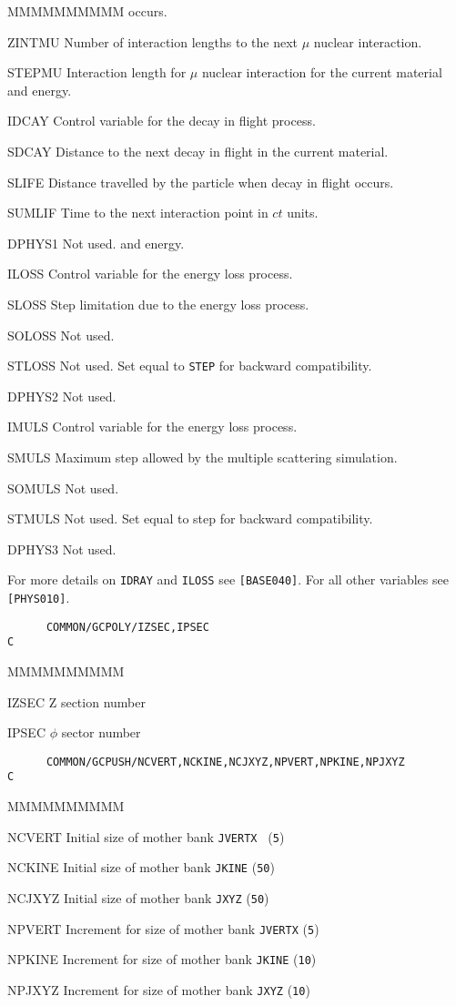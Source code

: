 \begin{DLtt}{MMMMMMMMMM}
occurs.
\item[ZINTMU] Number of interaction lengths to the next $\mu$ nuclear interaction.
\item[STEPMU] Interaction length for $\mu$ nuclear interaction for the current 
material and energy.
\item[IDCAY] Control variable for the decay in flight process.
\item[SDCAY] Distance to the next decay in flight in the current material.
\item[SLIFE] Distance travelled by the particle when decay in flight occurs.
\item[SUMLIF] Time to the next interaction point in $ct$ units.
\item[DPHYS1] Not used.
and energy.
\item[ILOSS] Control variable for the energy loss process.
\item[SLOSS] Step limitation due to the energy loss process.
\item[SOLOSS] Not used.
\item[STLOSS] Not used. Set equal to {\tt STEP} for backward compatibility.
\item[DPHYS2] Not used.
\item[IMULS] Control variable for the energy loss process.
\item[SMULS] Maximum step allowed by the multiple scattering simulation.
\item[SOMULS] Not used.
\item[STMULS] Not used. Set equal to step for backward compatibility.
\item[DPHYS3] Not used.
\end{DLtt}
For more details on {\tt IDRAY} and {\tt ILOSS} see {\tt [BASE040]}.
For all other variables see {\tt [PHYS010]}.
\begin{verbatim}
      COMMON/GCPOLY/IZSEC,IPSEC
C
\end{verbatim}
\begin{DLtt}{MMMMMMMMMM}
\item[IZSEC]    Z  section number
\item[IPSEC]    $\phi$ sector number
\end{DLtt}
\begin{verbatim}
      COMMON/GCPUSH/NCVERT,NCKINE,NCJXYZ,NPVERT,NPKINE,NPJXYZ
C
\end{verbatim}
\begin{DLtt}{MMMMMMMMMM}
\item[NCVERT] Initial size of mother bank {\tt JVERTX } ({\tt 5})
\item[NCKINE] Initial size of mother bank {\tt JKINE}  ({\tt 50})
\item[NCJXYZ] Initial size of mother bank {\tt JXYZ}  ({\tt 50})
\item[NPVERT] Increment for size of mother bank {\tt JVERTX}  ({\tt 5})
\item[NPKINE] Increment for size of mother bank {\tt JKINE}  ({\tt 10})
\item[NPJXYZ] Increment for size of mother bank {\tt JXYZ}  ({\tt 10})
\end{DLtt}
